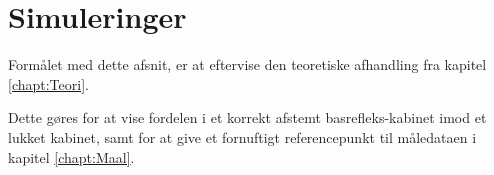 \chapter{Simuleringer}
Formålet med dette afsnit, er at eftervise den teoretiske afhandling fra kapitel \ref{chapt:Teori}.

Dette gøres for at vise fordelen i et korrekt afstemt basrefleks-kabinet imod et lukket kabinet, samt for at give et fornuftigt referencepunkt til måledataen i kapitel \ref{chapt:Maal}.



